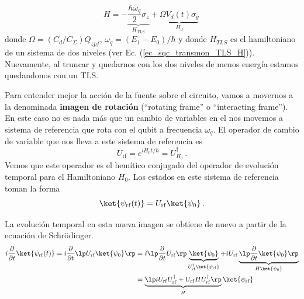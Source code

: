         \begin{equation} \label{ec_scq_drive_H}
        H = - \underbrace{\frac{\hbar \omega_q}{2} \sigma_z}_{H_{\mathrm{TLS}}} + \underbrace{\Omega V_d (t) \sigma_y}_{H_d}\,
        \end{equation}
        donde $\Omega = (C_d/C_{\varSigma}) Q_{zpf}$, $\omega_q = (E_1 - E_0)/\hbar$ y donde $H_{TLS}$ es el hamiltoniano de un sistema de dos niveles (ver Ec. (\ref{ec_sqc_transmon_TLS_H})). Nuevamente, al truncar y quedarnos con los dos niveles de menos energía estamos quedandonos con un TLS.
    

        
        

        Para entender mejor la acción de la fuente sobre el circuito, vamos a movernos a la denominada \textbf{imagen de rotación} (``rotating frame'' o ``interacting frame''). En este caso no es nada más que un cambio de variables en el nos movemos a sistema de referencia que rota con el qubit a frecuencia $\omega_q$. El operador de cambio de variable que nos lleva a este sistema de referencia es
        \begin{equation} \label{ec_scq_rotating_frame_U}
        U_{\mathrm{rf}} = e^{i H_0 t/\hbar} = U_{H_0}^\dagger \,.
        \end{equation}
        Vemos que este operador es el hemítico conjugado del operador de evolución temporal para el Hamiltoniano $H_0$. Los estados en este sistema de referencia toman la forma
        \begin{equation}
        \ket{\psi_{\mathrm{rf}}(t)} = U_{\mathrm{rf}} \ket{\psi_0} \, .
        \end{equation}
        
        La evolución temporal en esta nueva imagen se obtiene de nuevo a partir de la ecuación de Schrödinger. 
        \begin{equation}\label{ec_scq_rotating_frame_H_transform}
        \begin{split}
            i \frac{\partial }{\partial t} \ket{\psi_{\mathrm{rf}}(t)} = i  \frac{\partial }{\partial t} \lp   U_{\mathrm{rf}} \ket{\psi_0} \rp  
            & = i \lp \frac{\partial }{\partial t} U_{\mathrm{rf}} \rp \underbrace{\ket{\psi_0}}_{U_{\mathrm{rf}}^\dagger \ket{\psi_{\mathrm{rf}}}} + i U_{\mathrm{rf}} \underbrace{\lp \frac{\partial }{\partial t} \ket {\psi_0}  \rp}_{H\ket{\psi_0}} \\
            & = \underbrace{\lp i \dot{U}_{\mathrm{rf}} U_{\mathrm{rf}}^\dagger + U_{\mathrm{rf}} H U_{\mathrm{rf}}^\dagger \rp}_{\tilde{H}} \ket{\psi_{\mathrm{rf}}}
        \end{split}
        \end{equation}
        
